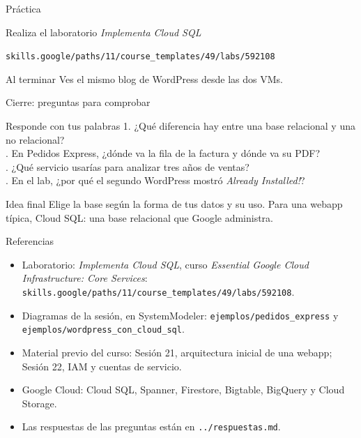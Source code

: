 \documentclass[aspectratio=169,10pt,c]{beamer}
\begin{document}
\begin{frame}[c]{Práctica}
\begin{block}{Realiza el laboratorio}
\large \textit{Implementa Cloud SQL}\par\vspace{1mm}
\small\texttt{skills.google/paths/11/course\_templates/49/labs/592108}
\end{block}
\begin{exampleblock}{Al terminar}
\small Ves el mismo blog de WordPress desde las dos VMs.
\end{exampleblock}
\end{frame}

\begin{frame}{Cierre: preguntas para comprobar}
\begin{block}{Responde con tus palabras}
\small
1. ¿Qué diferencia hay entre una base relacional y una no relacional?\\. En Pedidos Express, ¿dónde va la fila de la factura y dónde va su PDF?\\. ¿Qué servicio usarías para analizar tres años de ventas?\\. En el lab, ¿por qué el segundo WordPress mostró \textit{Already Installed!}?
\end{block}
\begin{alertblock}{Idea final}
\small Elige la base según la forma de tus datos y su uso. Para una webapp típica, Cloud SQL: una base relacional que Google administra.
\end{alertblock}
\end{frame}

\begin{frame}{Referencias}
\scriptsize
\begin{itemize}\setlength\itemsep{4pt}
  \item Laboratorio: \textit{Implementa Cloud SQL}, curso \textit{Essential Google Cloud Infrastructure: Core Services}: \texttt{skills.google/paths/11/course\_templates/49/labs/592108}.
  \item Diagramas de la sesión, en SystemModeler: \texttt{ejemplos/pedidos\_express} y \texttt{ejemplos/wordpress\_con\_cloud\_sql}.
  \item Material previo del curso: Sesión 21, arquitectura inicial de una webapp; Sesión 22, IAM y cuentas de servicio.
  \item Google Cloud: Cloud SQL, Spanner, Firestore, Bigtable, BigQuery y Cloud Storage.
  \item Las respuestas de las preguntas están en \texttt{../respuestas.md}.
\end{itemize}
\end{frame}
\end{document}
